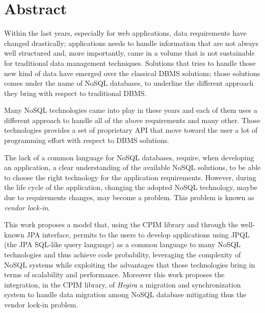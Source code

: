 \cleardoublepage

\thispagestyle{empty}

\chapter*{Abstract}
Within the last years, especially for web applications, data requirements have changed drastically; applications needs to handle information that are not always well structured and, more importantly, came in a volume that is not sustainable for traditional data management techniques. Solutions that tries to handle those new kind of data have emerged over the classical DBMS solutions; those solutions comes under the name of NoSQL databases, to underline the different approach they bring with respect to traditional  DBMS.

\noindent Many NoSQL technologies came into play in these years and each of them uses a different approach to handle all of the above requirements and many other. Those technologies provides a set of proprietary API that move toward the user a lot of programming effort with respect to DBMS solutions. 

\noindent The lack of a common language for NoSQL databases, require, when developing an application, a clear understanding of the available NoSQL solutions, to be able to choose the right technology for the application requirements. However, during the life cycle of the application, changing the adopted NoSQL technology, maybe due to requirements changes, may become a problem. This problem is known as \textit{vendor lock-in}.    

\noindent This work proposes a model that, using the CPIM library and through the well-known JPA interface, permits to the users to develop applications using JPQL (the JPA SQL-like query language) as a common language to many NoSQL technologies and thus achieve code probability, leveraging the complexity of NoSQL systems while exploiting the advantages that those technologies bring in terms of scalability and performance. Moreover this work proposes the integration, in the CPIM library, of \textit{Hegira} a migration and synchronization system to handle data migration among NoSQL database mitigating thus the vendor lock-in problem.

\cleardoublepage